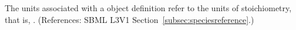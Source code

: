The units associated with a \SpeciesReference object definition refer to
the units of stoichiometry, that is, .  (References:
SBML L3V1 Section~\ref{subsec:speciesreference}.)

